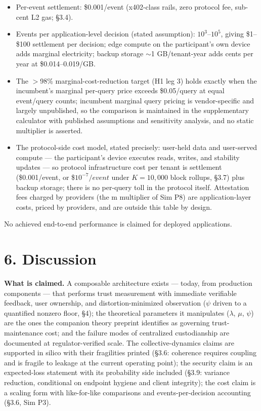 \documentclass[
]{article}
\begin{document}
\begin{itemize}
\item
  Per-event settlement: \$0.001/event (x402-class rails, zero protocol
  fee, sub-cent L2 gas; §3.4).
\item
  Events per application-level decision (stated assumption):
  \(10^{3}–10^{5}\), giving \$1--\$100 settlement per decision; edge
  compute on the participant's own device adds marginal electricity;
  backup storage \(\sim\)1 GB/tenant-year adds cents per year at
  \$0.014--0.019/GB.
\item
  The \(>\)98\% marginal-cost-reduction target (H1 leg 3) holds exactly
  when the incumbent's marginal per-query price exceeds \$0.05/query at
  equal event/query counts; incumbent marginal query pricing is
  vendor-specific and largely unpublished, so the comparison is
  maintained in the supplementary calculator with published assumptions
  and sensitivity analysis, and no static multiplier is asserted.
\item
  The protocol-side cost model, stated precisely: user-held data and
  user-served compute --- the participant's device executes reads,
  writes, and stability updates --- so protocol infrastructure cost per
  tenant is settlement (\$0.001/event, or \$\(10^{-7}/event\) under
  \(K = 10,000\) block rollups, §3.7) plus backup storage; there is no
  per-query toll in the protocol itself. Attestation fees charged by
  providers (the m multiplier of Sim P8) are application-layer costs,
  priced by providers, and are outside this table by design.
\end{itemize}

No achieved end-to-end performance is claimed for deployed applications.

\section{6. Discussion}\label{discussion}

\textbf{What is claimed.} A composable architecture exists --- today,
from production components --- that performs trust measurement with
immediate verifiable feedback, user ownership, and distortion-minimized
observation (\(\psi\) driven to a quantified nonzero floor, §4); the
theoretical parameters it manipulates (\(\lambda\), \(\mu\), \(\psi\))
are the ones the companion theory preprint identifies as governing
trust-maintenance cost; and the failure modes of centralized
custodianship are documented at regulator-verified scale. The
collective-dynamics claims are supported in silico with their
fragilities printed (§3.6: coherence requires coupling and is fragile to
leakage at the current operating point); the security claim is an
expected-loss statement with its probability side included (§3.9:
variance reduction, conditional on endpoint hygiene and client
integrity); the cost claim is a scaling form with like-for-like
comparisons and events-per-decision accounting (§3.6, Sim P3).
\end{document}
